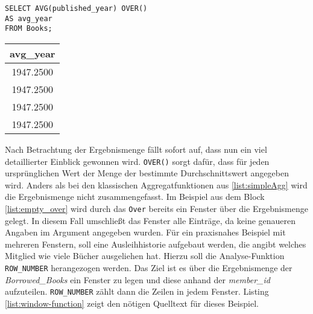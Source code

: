 \begin{minipage}{0.60\textwidth}
	 \begin{lstlisting}
SELECT AVG(published_year) OVER()
AS avg_year
FROM Books;
	\end{lstlisting}
\end{minipage}
\hfill
\begin{minipage}{0.45\textwidth}
	\centering
	\begin{tabular}{|c|}
		\hline
		\textbf{avg\_year} \\
		\hline
		1947.2500          \\
		\hline
		1947.2500          \\
		\hline
		1947.2500          \\
		\hline
		1947.2500          \\
		\hline
	\end{tabular}
	 \label{tab:ergebnis_over}
\end{minipage}

Nach Betrachtung der Ergebnismenge fällt sofort auf, dass nun ein viel detaillierter
Einblick gewonnen wird. \texttt{OVER()} sorgt dafür, dass für jeden
ursprünglichen Wert der Menge der bestimmte Durchschnittswert angegeben wird. Anders
als bei den klassischen Aggregatfunktionen aus \ref{list:simpleAgg} wird die Ergebnismenge
nicht zusammengefasst. Im Beispiel aus dem Block \ref{list:empty_over} wird
durch das \texttt{Over} bereits ein Fenster über die Ergebnismenge gelegt. In
diesem Fall umschließt das Fenster alle Einträge, da keine genaueren Angaben im Argument
angegeben wurden. Für ein praxisnahes Beispiel mit mehreren Fenstern, soll eine Ausleihhistorie
aufgebaut werden, die angibt welches Mitglied wie viele Bücher ausgeliehen hat. Hierzu
soll die Analyse-Funktion \texttt{ROW\_NUMBER} herangezogen werden. Das Ziel ist
es über die Ergebnismenge der \textit{Borrowed\_Books} ein Fenster zu legen und
diese anhand der \textit{member\_id} aufzuteilen. \texttt{ROW\_NUMBER} zählt dann
die Zeilen in jedem Fenster. Listing \ref{list:window-function} zeigt den
nötigen Quelltext für dieses Beispiel.

